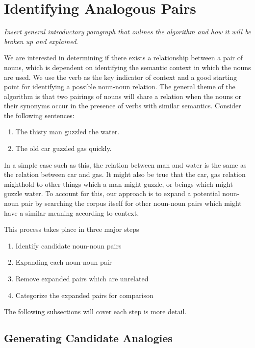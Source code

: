 \documentclass[11pt]{article}
\begin{document}
\section{Identifying Analogous Pairs}
\label{sec:identifying}

\emph{Insert general introductory paragraph that oulines the algorithm and how
  it will be broken up and explained}.

We are interested in determining if there exists a relationship between a pair
of nouns, which is dependent on identifying the semantic context in which the
nouns are used.  We use the verb as the key indicator of context and a good
starting point for identifying a possible noun-noun relation.  The general theme
of the algorithm is that two pairings of nouns will share a relation when the
nouns or their synonyms occur in the presence of verbs with similar semantics.
Consider the following sentences:
\begin{enumerate}
  \item The thisty man guzzled the water.
  \item The old car guzzled gas quickly.
\end{enumerate}

In a simple case such as this, the relation between man and water is the same as
the relation between car and gas.  It might also be true that the car, gas
relation mighthold to other things which a man might guzzle, or beings which
might guzzle water.  To account for this, our approach is to expand a potential
noun-noun pair by searching the corpus itself for other noun-noun pairs which
might have a similar meaning according to context.

This process takes place in three major steps
\begin{enumerate}
  \item Identify candidate noun-noun pairs
  \item Expanding each noun-noun pair
  \item Remove expanded pairs which are unrelated
  \item Categorize the expanded pairs for comparison
\end{enumerate}

The following subsections will cover each step is more detail.

\subsection{Generating Candidate Analogies}
\end{document}
